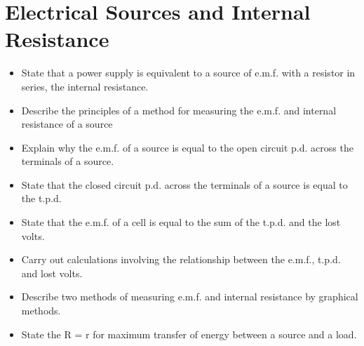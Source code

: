 \section{Electrical Sources and Internal Resistance}
\begin{multicols}{2}
	\begin{itemize}
        \item State that a power supply is equivalent to a source of e.m.f. with a
            resistor in series, the internal resistance.
        \item Describe the principles of a method for measuring the e.m.f. and
            internal resistance of a source
        \item Explain why the e.m.f. of a source is equal to the open circuit p.d.
            across the terminals of a source.
        \item State that the closed circuit p.d. across the terminals of a source is
            equal to the t.p.d.
        \item State that the e.m.f. of a cell is equal to the sum of the t.p.d. and the
            lost volts.
        \item Carry out calculations involving the relationship between the e.m.f.,
            t.p.d. and lost volts.
        \item Describe two methods of measuring e.m.f. and internal resistance by
            graphical methods.
        \item State the R = r for maximum transfer of energy between a source and
            a load.
	\end{itemize}
\end{multicols}

